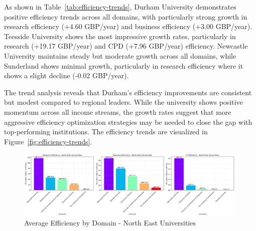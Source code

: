 \documentclass[journal,onecolumn, 10pt,draftclsnofoot]{IEEEtran}
\begin{document}
\begin{table}[h]
\centering
\caption{Efficiency Trends Analysis - North East Universities (GBP per staff day per year)}
\vspace{0.1cm}
\label{tab:efficiency-trends}
\end{table}

As shown in Table~\ref{tab:efficiency-trends}, Durham University demonstrates positive efficiency trends across all domains, with particularly strong growth in research efficiency (+4.60 GBP/year) and business efficiency (+3.00 GBP/year). Teesside University shows the most impressive growth rates, particularly in research (+19.17 GBP/year) and CPD (+7.96 GBP/year) efficiency. Newcastle University maintains steady but moderate growth across all domains, while Sunderland shows minimal growth, particularly in research efficiency where it shows a slight decline (-0.02 GBP/year).

The trend analysis reveals that Durham's efficiency improvements are consistent but modest compared to regional leaders. While the university shows positive momentum across all income streams, the growth rates suggest that more aggressive efficiency optimization strategies may be needed to close the gap with top-performing institutions. The efficiency trends are visualized in Figure~\ref{fig:efficiency-trends}.



\begin{figure}[h]
\centering
\includegraphics[width=0.99\textwidth]{Fig/figure38.ne_efficiency_comparison.png}
\caption{Average Efficiency by Domain - North East Universities}
\label{fig:ne-efficiency-comparison}
\end{figure}
\end{document}
